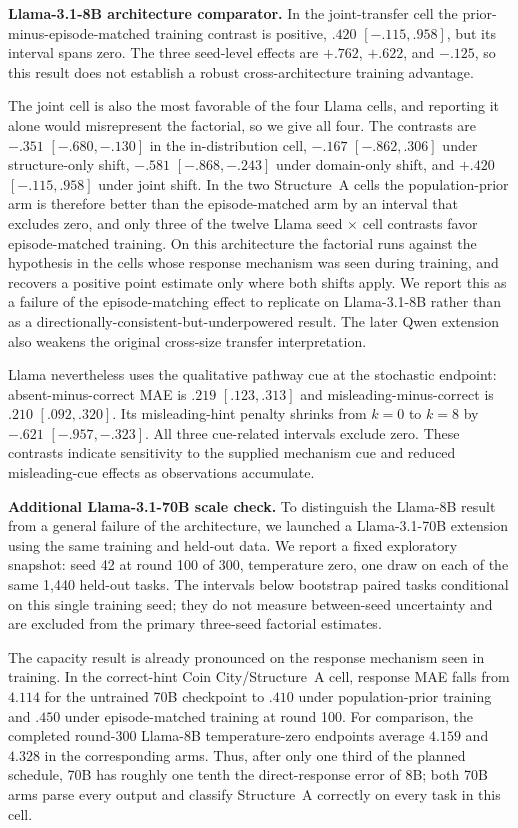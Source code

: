 \noindent\textbf{Llama-3.1-8B architecture comparator.}
In the joint-transfer cell the prior-minus-episode-matched training contrast is
positive, $.420$ $[-.115,.958]$, but its interval spans zero. The three seed-level
effects are $+.762$, $+.622$, and $-.125$, so this result does not establish a
robust cross-architecture training advantage.

The joint cell is also the most favorable of the four Llama cells, and
reporting it alone would misrepresent the factorial, so we give all four. The
contrasts are $-.351$ $[-.680,-.130]$ in the in-distribution cell, $-.167$
$[-.862,.306]$ under structure-only shift, $-.581$ $[-.868,-.243]$ under
domain-only shift, and $+.420$ $[-.115,.958]$ under joint shift. In the two
Structure~A cells the population-prior arm is therefore better than the
episode-matched arm by an interval that excludes zero, and only three of the twelve
Llama seed $\times$ cell contrasts favor episode-matched training. On this
architecture the factorial runs against the hypothesis in the cells
whose response mechanism was seen during training, and recovers a positive point
estimate only where both shifts apply. We report this as a failure of the
episode-matching effect to replicate on Llama-3.1-8B rather than as a
directionally-consistent-but-underpowered result. The later Qwen extension
also weakens the original cross-size transfer interpretation.

Llama nevertheless uses the qualitative
pathway cue at the stochastic endpoint:
absent-minus-correct MAE is $.219$ $[.123,.313]$ and
misleading-minus-correct is $.210$ $[.092,.320]$. Its misleading-hint penalty
shrinks from $k=0$ to $k=8$ by $-.621$ $[-.957,-.323]$. All three cue-related
intervals exclude zero. These contrasts indicate sensitivity to the supplied
mechanism cue and reduced misleading-cue effects as observations accumulate.

\noindent\textbf{Additional Llama-3.1-70B scale check.}
To distinguish the Llama-8B result from a general failure of the architecture,
we launched a Llama-3.1-70B extension using the same training
and held-out data. We report a fixed exploratory snapshot: seed 42 at round 100
of 300, temperature zero, one draw on each of the same 1,440 held-out tasks.
The intervals below bootstrap paired tasks conditional on this single training
seed; they do not measure between-seed uncertainty and are excluded from the
primary three-seed factorial estimates.

The capacity result is already pronounced on the response mechanism seen in
training. In the correct-hint Coin City/Structure~A cell, response MAE falls
from $4.114$ for the untrained 70B checkpoint to $.410$ under population-prior
training and $.450$ under episode-matched training at round 100. For comparison,
the completed round-300 Llama-8B temperature-zero endpoints average $4.159$ and
$4.328$ in the corresponding arms. Thus, after only one third of the planned
schedule, 70B has roughly one tenth the direct-response error of 8B; both 70B
arms parse every output and classify Structure~A correctly on every task in
this cell.

